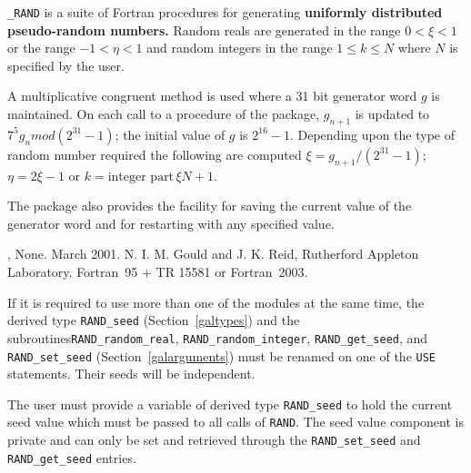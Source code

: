 \documentclass{galahad}
\newcommand{\packagename}{RAND}
\newcommand{\fullpackagename}{\libraryname\_\packagename}
\begin{document}
\galheader


\galsummary

{\tt \fullpackagename} is a suite of Fortran procedures for
generating {\bf uniformly distributed pseudo-random
 numbers. } Random reals are generated in the range $0 < \xi < 1$ or
 the range $-1 < \eta < 1$ and random integers in the range
 $1 \leq k \leq N$ where $N$ is specified by the user.

A multiplicative congruent method is used where a 31 bit generator
 word $g$ is maintained. On each call to a procedure of the package,
 $g_{n+1} $ is updated to $7^5 g_n mod (2^{31} - 1)$; the
 initial value of $g$ is $2^{16} - 1$.
 Depending upon the type of random number
 required the following are computed $\xi = g_{n+1} /(2^{31} - 1)$;
 $\eta = 2 \xi - 1$ or $k = \mbox{integer part}\, \xi N +1$.

The package also provides the facility for saving the current
 value of the generator word and for restarting with any specified
 value.



\galattributes
\galversions{\tt  \fullpackagename\_single, \fullpackagename\_double},
\galuses None.
\galdate March 2001.
\galorigin
N. I. M. Gould and J. K. Reid, Rutherford Appleton Laboratory.
\gallanguage Fortran~95 + TR 15581 or Fortran~2003.


\galhowto



\noindent
If it is required to use more than one of the modules at the same time, 
the derived type
{\tt \packagename\_seed}
(Section~\ref{galtypes})
and the subroutines{\tt \packagename\_random\_real},
{\tt \packagename\_random\_integer},
{\tt \packagename\_get\_seed},
and {\tt \packagename\_set\_seed}
(Section~\ref{galarguments})
must be renamed on one of the {\tt USE} statements.
Their seeds will be independent.





\galtypes
The user must provide a variable of derived type
{\tt \packagename\_seed}
to hold the current seed value which must be passed to all calls of
{\tt \packagename}.
The seed value component is private and can only be set and retrieved
through the
{\tt \packagename\_set\_seed}  and {\tt \packagename\_get\_seed} entries.
\end{document}

